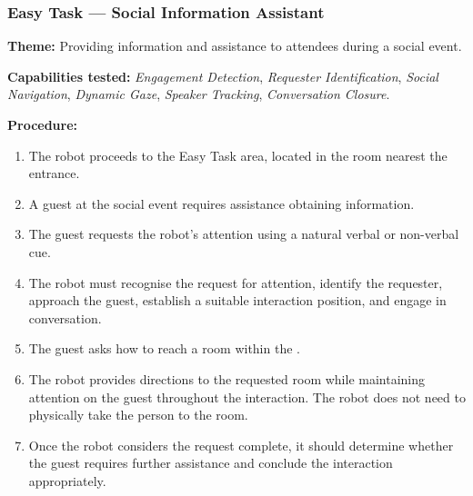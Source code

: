 \subsubsection*{Easy Task --- Social Information Assistant}

\noindent \textbf{Theme:}
Providing information and assistance to attendees during a social event.

\medskip
\noindent \textbf{Capabilities tested:}
\emph{Engagement Detection}, \emph{Requester Identification}, \emph{Social Navigation}, \emph{Dynamic Gaze}, \emph{Speaker Tracking}, \emph{Conversation Closure}.

\medskip
\noindent \textbf{Procedure:}
\begin{enumerate}[nosep]
	\item The robot proceeds to the Easy Task area, located in the room nearest the \Arena{} entrance.
	\item A guest at the social event requires assistance obtaining information.
	\item The guest requests the robot's attention using a natural verbal or non-verbal cue.
	\item The robot must recognise the request for attention, identify the requester, approach the guest, establish a suitable interaction position, and engage in conversation.
	\item The guest asks how to reach a room within the \Arena{}.
	\item The robot provides directions to the requested room while maintaining attention on the guest throughout the interaction. The robot does not need to physically take the person to the room.
	\item Once the robot considers the request complete, it should determine whether the guest requires further assistance and conclude the interaction appropriately.
\end{enumerate}

